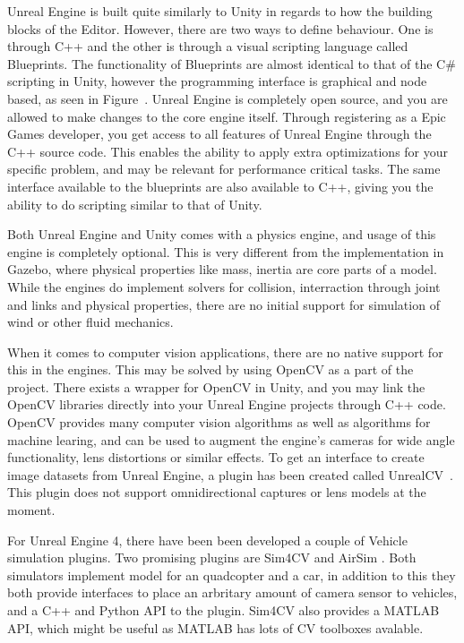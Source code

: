 Unreal Engine is built quite similarly to Unity in regards to how the building blocks of the Editor. However, there are two ways to define behaviour. One is through C++ and the other is through a visual scripting language called Blueprints. The functionality of Blueprints are almost identical to that of the C\# scripting in Unity, however the programming interface is graphical and node based, as seen in Figure~. Unreal Engine is completely open source, and you are allowed to make changes to the core engine itself. Through registering as a Epic Games developer, you get access to all features of Unreal Engine through the C++ source code. This enables the ability to apply extra optimizations for your specific problem, and may be relevant for performance critical tasks. The same interface available to the blueprints are also available to C++, giving you the ability to do scripting similar to that of Unity.

Both Unreal Engine and Unity comes with a physics engine, and usage of this engine is completely optional. This is very different from the implementation in Gazebo, where physical properties like mass, inertia are core parts of a model. While the engines do implement solvers for collision, interraction through joint and links and physical properties, there are no initial support for simulation of wind or other fluid mechanics.

When it comes to computer vision applications, there are no native support for this in the engines. This may be solved by using OpenCV \cite{OpenCVweb} as a part of the project. There exists a wrapper for OpenCV in Unity, and you may link the OpenCV libraries directly into your Unreal Engine projects through C++ code. OpenCV provides many computer vision algorithms as well as algorithms for machine learing, and can be used to augment the engine's cameras for wide angle functionality, lens distortions or similar effects. To get an interface to create image datasets from Unreal Engine, a plugin has been created called UnrealCV~\cite{UnrealCV}. This plugin does not support omnidirectional captures or lens models at the moment.

For Unreal Engine 4, there have been been developed a couple of Vehicle simulation plugins. Two promising plugins are Sim4CV \cite{Sim4CV_paper} and AirSim \cite{Airsim_paper, AirsimGit}. Both simulators implement model for an quadcopter and a car, in addition to this they both provide interfaces to place an arbritary amount of camera sensor to vehicles, and a C++ and Python API to the plugin. Sim4CV also provides a MATLAB API, which might be useful as MATLAB has lots of CV toolboxes avalable. 

